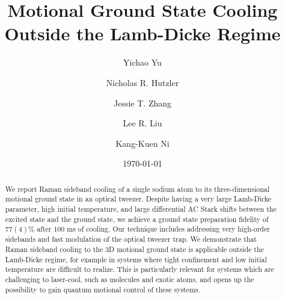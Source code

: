 \documentclass[aps,prl,twocolumn,groupedaddress]{revtex4-1}
\begin{document}
\title{Motional Ground State Cooling Outside the Lamb-Dicke Regime}
\author{Yichao Yu}
\author{Nicholas R. Hutzler}
\author{Jessie T. Zhang}
\author{Lee R. Liu}
\author{Kang-Kuen Ni}

\date{\today}

\begin{abstract}
  We report Raman sideband cooling of a single sodium atom to its three-dimensional
  motional ground state in an optical tweezer.
  Despite having a very large Lamb-Dicke parameter, high initial temperature, and
  large differential AC Stark shifts between the excited state and the ground state,
  we achieve a ground state preparation fidelity of $77(4)$\% after $100$ ms of cooling.
  Our technique includes addressing very high-order sidebands and
  fast modulation of the optical tweezer trap.
  We demonstrate that Raman sideband cooling to the 3D motional ground state is applicable
  outside the Lamb-Dicke regime, for example in
  systems where tight confinement and low initial temperature are difficult to realize.
  This is particularly relevant for systems which are challenging to laser-cool,
  such as molecules and exotic atoms,
  and opens up the possibility to gain quantum motional control of these systems.
\end{abstract}

\maketitle
\end{document}

